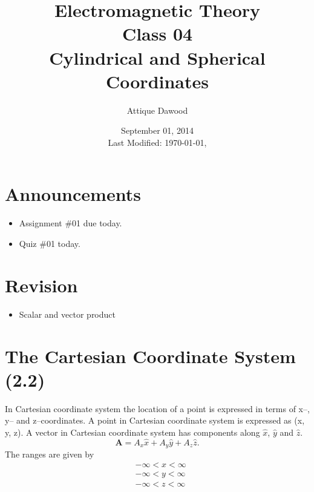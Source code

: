 \documentclass[12pt,a4paper]{article}
\title{Electromagnetic Theory\\Class 04\\Cylindrical and Spherical Coordinates}
\author{Attique Dawood}
\date{September 01, 2014\\[0.2cm] Last Modified: \today, \currenttime}
\begin{document}
\maketitle
\section{Announcements}
\begin{itemize}
\item Assignment \#01 due today.
\item Quiz \#01 today.
\end{itemize}
\section{Revision}
\begin{itemize}
\item Scalar and vector product
\end{itemize}
\section{The Cartesian Coordinate System (2.2)}
In Cartesian coordinate system the location of a point is expressed in terms of x--, y-- and z--coordinates. A point in Cartesian coordinate system is expressed as (x, y, z). A vector in Cartesian coordinate system has components along $\hat x$, $\hat y$ and $\hat z$.
\begin{equation}
\textbf{A}=A_x\hat x+A_y\hat y+ A_z\hat z.
\end{equation}
The ranges are given by
\begin{equation*}
\begin{split}
&-\infty < x < \infty\\
&-\infty < y < \infty\\
&-\infty < z < \infty\\
\end{split}
\end{equation*}
\end{document}
